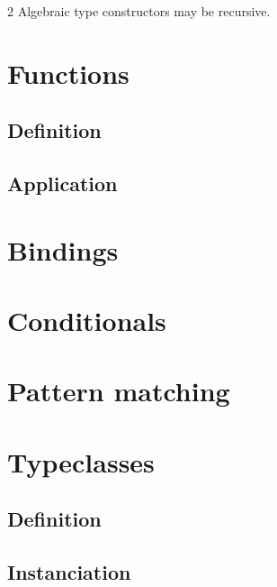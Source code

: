 \begin{multicols*}{2}
Algebraic type constructors may be recursive.

\section{Functions}

\subsection{Definition}

\subsection{Application}

\section{Bindings}

\section{Conditionals}

\section{Pattern matching}

\section{Typeclasses}

\subsection{Definition}

\subsection{Instanciation}

\end{multicols*}
